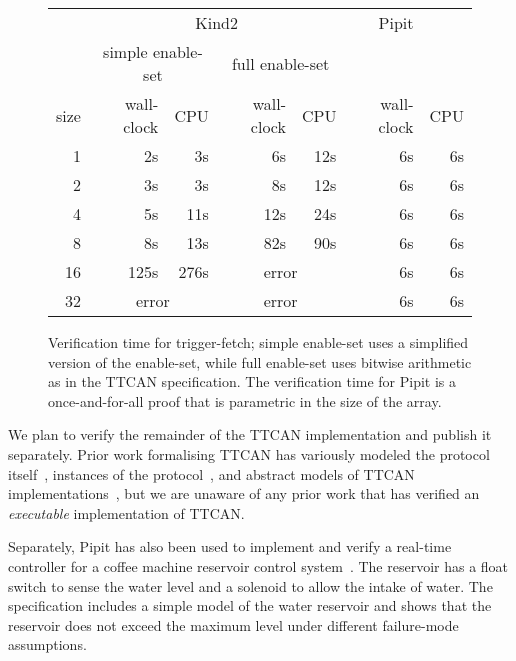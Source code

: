 \begin{figure}
  \center
\begin{tabular}{r|rr|rr|rr}
  & \multicolumn{4}{c|}{Kind2} & Pipit \\
  & \multicolumn{2}{c|}{simple enable-set} & \multicolumn{2}{c|}{full enable-set} & \\
  size & wall-clock & CPU & wall-clock & CPU & wall-clock & CPU \\
  \hline
  1 & 2s &  3s  & 6s & 12s & 6s & 6s \\
  2 & 3s &  3s  & 8s & 12s & 6s & 6s \\
  4 & 5s & 11s  & 12s & 24s & 6s & 6s \\
  8 & 8s & 13s  & 82s & 90s & 6s & 6s \\
  16 & 125s & 276s & \multicolumn{2}{c|}{error} & 6s & 6s \\
  32 & \multicolumn{2}{c|}{error} & \multicolumn{2}{c|}{error} & 6s & 6s \\
\end{tabular}
\caption{Verification time for trigger-fetch; simple enable-set uses a simplified version of the enable-set, while full enable-set uses bitwise arithmetic as in the TTCAN specification. The verification time for Pipit is a once-and-for-all proof that is parametric in the size of the array.}
\label{f:evaluation:kind2-runtime}
\end{figure}

We plan to verify the remainder of the TTCAN implementation and publish it separately.
Prior work formalising TTCAN has variously modeled the protocol itself~\cite{saha2007finite, pan2014modeling,li2018formal},
instances of the protocol~\cite{guo2020model},
and abstract models of TTCAN implementations~\cite{leen2006modeling}, but we are unaware of any prior work that has verified an \emph{executable} implementation of TTCAN.

Separately, Pipit has also been used to implement and verify a real-time controller for a coffee machine reservoir control system~\cite{robinson2023pipit}.
The reservoir has a float switch to sense the water level and a solenoid to allow the intake of water.
The specification includes a simple model of the water reservoir and shows that the reservoir does not exceed the maximum level under different failure-mode assumptions.

